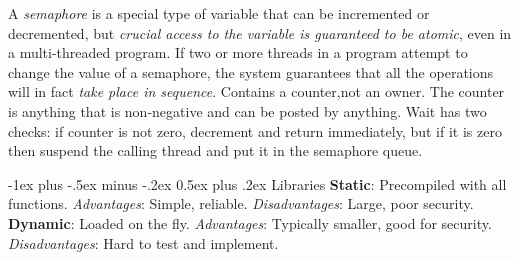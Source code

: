 \documentclass[10pt,landscape, a4paper]{article}
\makeatletter
\renewcommand{\section}{\@startsection{section}{1}{0mm}%
                                {-1ex plus -.5ex minus -.2ex}%
                                {0.5ex plus .2ex}%
                                {\normalfont\large\bfseries}}
\makeatother
\begin{document}
\begin{multicols}{3}
A \emph{semaphore} is a special type of variable that can be incremented or decremented, 
but \emph{crucial access to the variable is guaranteed to be atomic}, even in a multi-threaded program.
If two or more threads in a program attempt to change the value of a semaphore, 
the system guarantees that all the operations will in fact \emph{take place in sequence}.
Contains a counter,not an owner. The counter is anything that is non-negative and can be 
posted by anything. Wait has two checks: if counter is not zero, decrement and return 
immediately, but if it is zero then suspend the calling thread and put it in the 
semaphore queue. 



\section{Libraries}
\textbf{Static}: Precompiled with all functions.
\emph{Advantages}: Simple, reliable.
\emph{Disadvantages}: Large, poor security.
\textbf{Dynamic}: Loaded on the fly.
\emph{Advantages}: Typically smaller, good for security.
\emph{Disadvantages}: Hard to test and implement.



\end{multicols}
\end{document}
